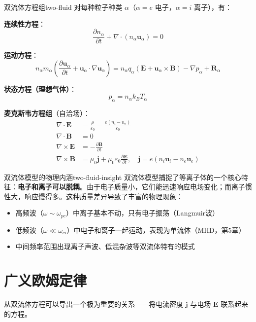 \documentclass[12pt,a4paper,openany,oneside]{book}
\newcommand{\eps}{\varepsilon}
\newcommand{\vect}[1]{\bm{#1}}
\newcommand{\grad}{\nabla}
\newcommand{\curl}{\nabla\times}
\newcommand{\divg}{\nabla\cdot}
\newcommand{\difficulty}[1]{\marginnote{\textcolor{red}{\textbf{[#1]}}}}
\begin{document}
\begin{theorem}{双流体方程组}{two-fluid}
对每种粒子种类 $\alpha$（$\alpha = e$ 电子，$\alpha = i$ 离子），有：

\textbf{连续性方程}：
\[
\frac{\partial n_\alpha}{\partial t} + \divg(n_\alpha\vect{u}_\alpha) = 0
\]

\textbf{运动方程}：
\[
n_\alpha m_\alpha\left(\frac{\partial\vect{u}_\alpha}{\partial t} + \vect{u}_\alpha\cdot\grad\vect{u}_\alpha\right) = n_\alpha q_\alpha(\vect{E} + \vect{u}_\alpha\times\vect{B}) - \grad p_\alpha + \vect{R}_\alpha
\]

\textbf{状态方程（理想气体）}：
\[
p_\alpha = n_\alpha k_B T_\alpha
\]

\textbf{麦克斯韦方程组}（自洽场）：
\begin{align*}
\divg\vect{E} &= \frac{\rho}{\eps_0} = \frac{e(n_i - n_e)}{\eps_0} \\
\divg\vect{B} &= 0 \\
\curl\vect{E} &= -\frac{\partial\vect{B}}{\partial t} \\
\curl\vect{B} &= \mu_0\vect{j} + \mu_0\eps_0\frac{\partial\vect{E}}{\partial t}, \quad \vect{j} = e(n_i\vect{u}_i - n_e\vect{u}_e)
\end{align*}
\end{theorem}

\begin{insight}{双流体模型的物理内涵}{two-fluid-insight}
双流体模型捕捉了等离子体的一个核心特征：\textbf{电子和离子可以脱耦}。由于电子质量小，它们能迅速响应电场变化；而离子惯性大，响应慢得多。这种质量差异导致了丰富的物理现象：
\begin{itemize}
\item 高频波（$\omega \sim \omega_{pe}$）中离子基本不动，只有电子振荡（Langmuir波）
\item 低频波（$\omega \ll \omega_{ci}$）中电子和离子一起运动，表现为单流体（MHD，第5章）
\item 中间频率范围出现离子声波、低混杂波等双流体特有的模式
\end{itemize}
\end{insight}

\section{广义欧姆定律}\difficulty{提高}

从双流体方程可以导出一个极为重要的关系——将电流密度 $\vect{j}$ 与电场 $\vect{E}$ 联系起来的方程。
\end{document}
